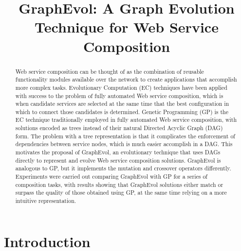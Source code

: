 \documentclass{article}
\title{GraphEvol: A Graph Evolution Technique for Web Service Composition}
\begin{document}
\maketitle

\begin{abstract}
  Web service composition can be thought of as the combination of reusable functionality modules available over the network to
  create applications that accomplish more complex tasks. Evolutionary Computation (EC) techniques have been applied with success
  to the problem of fully automated Web service composition, which is when candidate services are selected at the same time that the best configuration in which to connect those candidates is determined.
  Genetic Programming (GP) is the EC technique traditionally employed in fully automated Web service composition, with
  solutions encoded as trees instead of their natural Directed Acyclic Graph (DAG) form. The problem with a tree representation is that it complicates
  the enforcement of dependencies between service nodes, which is much easier accomplish in a DAG. This motivates the proposal of
  GraphEvol, an evolutionary technique that uses DAGs directly to represent and evolve Web service composition solutions. GraphEvol is analogous to GP, but it
  implements the mutation and crossover operators differently. Experiments were carried out comparing GraphEvol with GP
  for a series of composition tasks, with results showing that GraphEvol solutions either match or surpass the quality of those 
  obtained using GP, at the same time relying on a more intuitive representation.
\end{abstract}

\section{Introduction}
\end{document}
